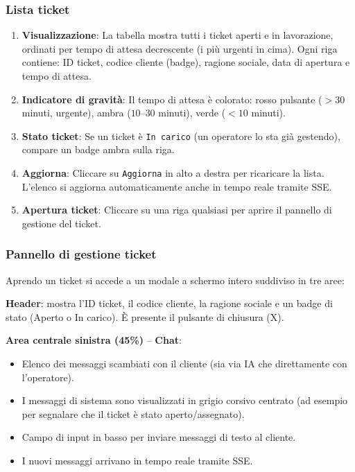 \documentclass[a4paper, 11pt, oneside]{scrartcl}
\begin{document}
\subsubsection{Lista ticket}
\begin{enumerate}
    \item \textbf{Visualizzazione}: La tabella mostra tutti i ticket aperti e in lavorazione, ordinati per tempo di attesa decrescente (i pi\`u urgenti in cima). Ogni riga contiene: ID ticket, codice cliente (badge), ragione sociale, data di apertura e tempo di attesa.
    \item \textbf{Indicatore di gravit\`a}: Il tempo di attesa \`e colorato: rosso pulsante ($> 30$ minuti, urgente), ambra ($10$--$30$ minuti), verde ($< 10$ minuti).
    \item \textbf{Stato ticket}: Se un ticket \`e \texttt{In carico} (un operatore lo sta gi\`a gestendo), compare un badge ambra sulla riga.
    \item \textbf{Aggiorna}: Cliccare su \texttt{Aggiorna} in alto a destra per ricaricare la lista. L'elenco si aggiorna automaticamente anche in tempo reale tramite SSE.
    \item \textbf{Apertura ticket}: Cliccare su una riga qualsiasi per aprire il pannello di gestione del ticket.
\end{enumerate}

\subsubsection{Pannello di gestione ticket}
Aprendo un ticket si accede a un modale a schermo intero suddiviso in tre aree:

\textbf{Header}: mostra l'ID ticket, il codice cliente, la ragione sociale e un badge di stato (Aperto o In carico). \`E presente il pulsante di chiusura (X).

\textbf{Area centrale sinistra (45\%)} -- \textbf{Chat}:
\begin{itemize}
    \item Elenco dei messaggi scambiati con il cliente (sia via IA che direttamente con l'operatore).
    \item I messaggi di sistema sono visualizzati in grigio corsivo centrato (ad esempio per segnalare che il ticket \`e stato aperto/assegnato).
    \item Campo di input in basso per inviare messaggi di testo al cliente.
    \item I nuovi messaggi arrivano in tempo reale tramite SSE.
\end{itemize}
\end{document}
